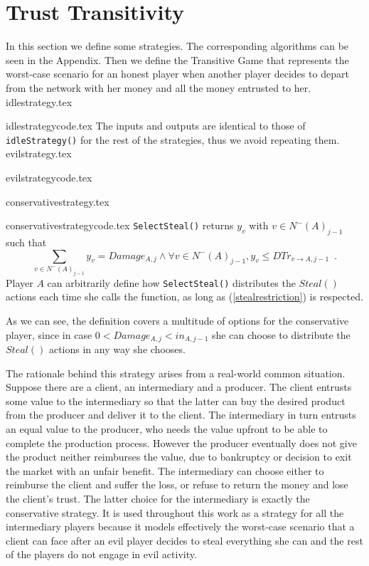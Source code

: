   \section{Trust Transitivity}
     In this section we define some strategies. The corresponding algorithms can be seen in the Appendix. Then we define the
     Transitive Game that represents the worst-case scenario for an honest player when another player decides to depart from
     the network with her money and all the money entrusted to her.
     {idlestrategy.tex}

     {idlestrategycode.tex}
     The inputs and outputs are identical to those of \texttt{idleStrategy()} for the rest of the strategies, thus we avoid
     repeating them.
     {evilstrategy.tex}

     {evilstrategycode.tex}

     {conservativestrategy.tex}

     {conservativestrategycode.tex}
     \texttt{SelectSteal()} returns $y_v$ with $v \in N^{-}\left(A\right)_{j-1}$ such that
     \begin{equation}
     \label{stealrestriction}
        \sum\limits_{v \in N^{-}\left(A\right)_{j-1}}y_v = Damage_{A, j} \wedge \forall v \in N^{-}\left(A\right)_{j-1},
        y_v \leq DTr_{v \rightarrow A, j-1} \enspace.
     \end{equation}
     Player $A$ can arbitrarily define how \texttt{SelectSteal()} distributes the $Steal\left(\right)$ actions
     each time she calls the function, as long as (\ref{stealrestriction}) is respected. 

     As we can see, the definition covers a multitude of options for the conservative player, since in case $0 < Damage_{A,j}
     < in_{A,j-1}$ she can choose to distribute the $Steal\left(\right)$ actions in any way she chooses.

     The rationale behind this strategy arises from a real-world common situation. Suppose there are a client, an
     intermediary and a producer. The client entrusts some value to the intermediary so that the latter can buy the desired
     product from the producer and deliver it to the client. The intermediary in turn entrusts an equal value to the
     producer, who needs the value upfront to be able to complete the production process. However the producer eventually
     does not give the product neither reimburses the value, due to bankruptcy or decision to exit the market with an unfair
     benefit. The intermediary can choose either to reimburse the client and suffer the loss, or refuse to return the money
     and lose the client's trust. The latter choice for the intermediary is exactly the conservative strategy. It is used
     throughout this work as a strategy for all the intermediary players because it models effectively the worst-case
     scenario that a client can face after an evil player decides to steal everything she can and the rest of the players do
     not engage in evil activity.

